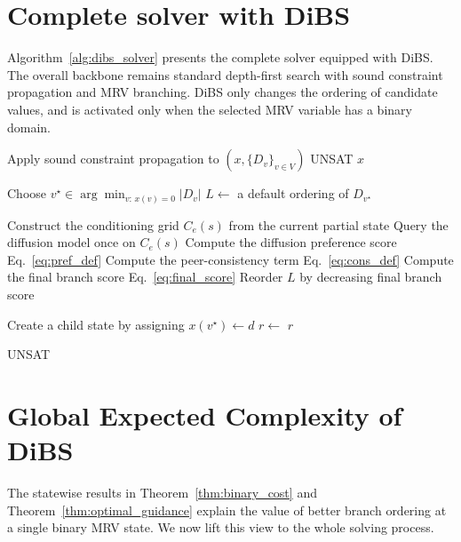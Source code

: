\documentclass[lettersize,journal]{IEEEtran}
\begin{document}
\section{Complete solver with DiBS}

Algorithm~\ref{alg:dibs_solver} presents the complete solver equipped with DiBS. The overall backbone remains standard depth-first search with sound constraint propagation and MRV branching. DiBS only changes the ordering of candidate values, and is activated only when the selected MRV variable has a binary domain.

\begin{algorithm}[h]
	\caption{Complete CP+MRV solver with DiBS branch ordering}
	\label{alg:dibs_solver}
	\begin{algorithmic}[1]
		\State Apply sound constraint propagation to $(x,\{D_v\}_{v\in V})$
		\State \Return UNSAT
		\EndIf
		\State \Return $x$
		\EndIf

		\State Choose
		$
		v^\star \in \arg\min_{v:\,x(v)=0}|D_v|
		$
		\State $L \gets$ a default ordering of $D_{v^\star}$

		\State Construct the conditioning grid $C_e(s)$ from the current partial state
		\State Query the diffusion model once on $C_e(s)$
		\State Compute the diffusion preference score Eq.~\eqref{eq:pref_def}
		\State Compute the peer-consistency term Eq.~\eqref{eq:cons_def}
		\State Compute the final branch score Eq.~\eqref{eq:final_score}
		\EndFor
		\State Reorder $L$ by decreasing final branch score
		\EndIf

		\State Create a child state by assigning $x(v^\star)\gets d$
		\State $r \gets$ 
		\State \Return $r$
		\EndIf
		\EndFor

		\State \Return UNSAT
		\EndFunction
	\end{algorithmic}
\end{algorithm}



\section{Global Expected Complexity of DiBS}
\label{sec:global_complexity}

The statewise results in Theorem~\ref{thm:binary_cost} and
Theorem~\ref{thm:optimal_guidance} explain the value of better
branch ordering at a single binary MRV state. We now lift this
view to the whole solving process.
\end{document}
